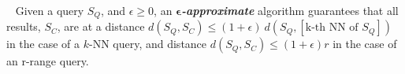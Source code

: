 \vspace*{-0.2cm}
\begin{defn}~\cite{journal/pvldb/echihabi2018} \label{def:epsmatch}
Given a query $S_Q$, and $\epsilon \geq 0$, an \textit{\textbf{$\bm{\epsilon}$-approximate}} algorithm guarantees that all results, $S_C$, are at a distance $d(S_Q,S_C) \leq (1+\epsilon)\ d(S_Q,[\text{k-th NN of }S_Q])$ in the case of a $k$-NN query, and distance $d(S_Q,S_C) \leq (1+\epsilon)r$ in the case of an r-range query.
\end{defn}

